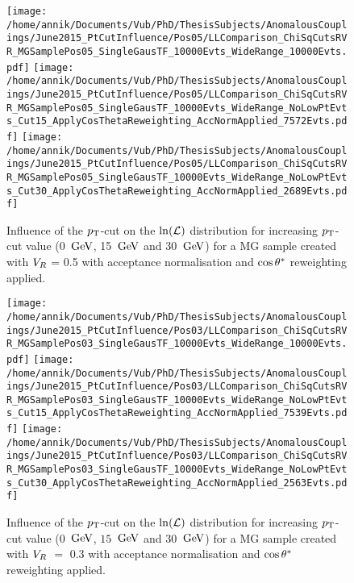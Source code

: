 \begin{figure}[h!t]
 \centering
 \texttt{[image: /home/annik/Documents/Vub/PhD/ThesisSubjects/AnomalousCouplings/June2015\_PtCutInfluence/Pos05/LLComparison\_ChiSqCutsRVR\_MGSamplePos05\_SingleGausTF\_10000Evts\_WideRange\_10000Evts.pdf]}
 \texttt{[image: /home/annik/Documents/Vub/PhD/ThesisSubjects/AnomalousCouplings/June2015\_PtCutInfluence/Pos05/LLComparison\_ChiSqCutsRVR\_MGSamplePos05\_SingleGausTF\_10000Evts\_WideRange\_NoLowPtEvts\_Cut15\_ApplyCosThetaReweighting\_AccNormApplied\_7572Evts.pdf]}
 \texttt{[image: /home/annik/Documents/Vub/PhD/ThesisSubjects/AnomalousCouplings/June2015\_PtCutInfluence/Pos05/LLComparison\_ChiSqCutsRVR\_MGSamplePos05\_SingleGausTF\_10000Evts\_WideRange\_NoLowPtEvts\_Cut30\_ApplyCosThetaReweighting\_AccNormApplied\_2689Evts.pdf]}
 \caption{Influence of the $p_{\textrm T}$-cut on the $\ln(\mathcal{L})$ distribution for increasing $p_{\textrm T}$-cut value (0 $\, \mathrm{GeV}$, 15 $\, \mathrm{GeV}$ and 30 $\, \mathrm{GeV}$) for a MG sample created with $V_{R}$ = 0.5 with acceptance normalisation and $\cos \theta^{*}$ reweighting applied.}
 \label{fig::AccNormCosPos05}
\end{figure}

\begin{figure}[h!t]
 \centering
 \texttt{[image: /home/annik/Documents/Vub/PhD/ThesisSubjects/AnomalousCouplings/June2015\_PtCutInfluence/Pos03/LLComparison\_ChiSqCutsRVR\_MGSamplePos03\_SingleGausTF\_10000Evts\_WideRange\_10000Evts.pdf]}
 \texttt{[image: /home/annik/Documents/Vub/PhD/ThesisSubjects/AnomalousCouplings/June2015\_PtCutInfluence/Pos03/LLComparison\_ChiSqCutsRVR\_MGSamplePos03\_SingleGausTF\_10000Evts\_WideRange\_NoLowPtEvts\_Cut15\_ApplyCosThetaReweighting\_AccNormApplied\_7539Evts.pdf]}
 \texttt{[image: /home/annik/Documents/Vub/PhD/ThesisSubjects/AnomalousCouplings/June2015\_PtCutInfluence/Pos03/LLComparison\_ChiSqCutsRVR\_MGSamplePos03\_SingleGausTF\_10000Evts\_WideRange\_NoLowPtEvts\_Cut30\_ApplyCosThetaReweighting\_AccNormApplied\_2563Evts.pdf]}
 \caption{Influence of the $p_{\textrm T}$-cut on the $\ln(\mathcal{L})$ distribution for increasing $p_{\textrm T}$-cut value ($0$ $\, \mathrm{GeV}$, $15$ $\, \mathrm{GeV}$ and $30$ $\, \mathrm{GeV}$) for a MG sample created with $V_{R}$ $=$ $0.3$ with acceptance normalisation and $\cos \theta^{*}$ reweighting applied.}
 \label{fig::AccNormCosPos03}
\end{figure}

